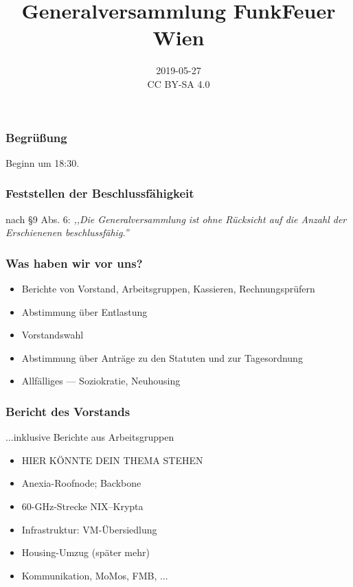 \documentclass[17pt]{beamer}
\title[]{Generalversammlung FunkFeuer Wien}
\date[]{2019-05-27\\\vspace{1cm}\tiny CC BY-SA 4.0}
\begin{document}
\frame{\titlepage}

%

\begin{frame}
	\frametitle{Begrüßung}
	Beginn um 18:30.
\end{frame}



\begin{frame}
	\frametitle{Feststellen der Beschlussfähigkeit}
	nach §9 Abs. 6:
	\textit{,,Die Generalversammlung ist ohne Rücksicht auf die Anzahl der
	Erschienenen beschlussfähig.''}
\end{frame}



\begin{frame}
	\frametitle{Was haben wir vor uns?}
	\begin{itemize}
		\item Berichte von Vorstand, Arbeitsgruppen, Kassieren,
		Rechnungsprüfern
		\item Abstimmung über Entlastung
		\item Vorstandswahl
		\item Abstimmung über Anträge zu den Statuten und zur Tagesordnung
		\item Allfälliges --- Soziokratie, Neuhousing
	\end{itemize}
\end{frame}



\begin{frame}
	\frametitle{Bericht des Vorstands}
	...inklusive Berichte aus Arbeitsgruppen
	\begin{itemize}
		\item HIER KÖNNTE DEIN THEMA STEHEN
		\item Anexia-Roofnode; Backbone
		\item 60-GHz-Strecke NIX--Krypta
		\item Infrastruktur: VM-Übersiedlung
		\item Housing-Umzug (später mehr)
		\item Kommunikation, MoMos, FMB, ...
	\end{itemize}
\end{frame}
\end{document}
